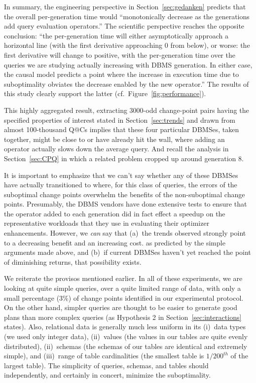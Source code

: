 \documentclass[prodmode,acmtods]{acmsmall}
\begin{document}
In summary, the engineering perspective in Section~\ref{sec:gedanken}
predicts that the overall per-generation time would ``monotonically decrease
as the generations add query evaluation operators.'' The scientific
perspective reaches the opposite conclusion: ``the
per-generation time will either asymptotically approach a horizontal line
(with the first derivative approaching 0 from below), or worse: the first
derivative will change to positive, with the per-generation time over the
queries we are studying actually increasing with \hbox{DBMS}
generation. In either case, the causal model predicts a point where the
\hbox{increase} in execution time due to suboptimality obviates the decrease
enabled by the new operator.'' The results of this study clearly support
the latter (cf.~Figure~\ref{fig:performance}).

This highly aggregated result, extracting 3000-odd change-point pairs having
the specified properties of interest stated in Section~\ref{sec:trends} and
drawn from almost \hbox{100-thousand} Q@Cs implies that these four
particular \hbox{DBMSes}, taken together, might be close to or have already
hit the wall, where adding an operator actually slows down the average
query. And recall the analysis in Section~\ref{sec:CPQ} in which a
related problem cropped up around generation 8.

It is important to emphasize that we can't say whether any of these DBMSes have actually
transitioned to where, for this class of queries, the errors of the
suboptimal change points overwhelm the benefits of the non-suboptimal change
points. Presumably, the DBMS vendors have done extensive tests to ensure
that the operator added to each generation did in fact effect a speedup on
the representative workloads that they use in evaluating their optimizer
enhancements. However, we {\em can} say that (a)~the trends observed
strongly point to a decreasing benefit and an increasing cost. as predicted
by the simple arguments made above, and (b)~if current DBMSes haven't yet
reached the point of diminishing returns, that possibility exists.

We reiterate the provisos mentioned earlier. In all of these
experiments, we are looking at quite simple queries, over a quite limited
range of data, with only a small percentage (3\%) of change points
identified in our experimental protocol. On the other hand, simpler queries
are thought to be easier to generate good plans than more complex queries
(as Hypothesis 2 in Section~\ref{sec:interactions} states). Also, relational
data is generally much less uniform in its (i)~data types (we used only
integer data), (ii)~values (the values in our tables are quite evenly
distributed), (ii)~schemas (the schemas of our tables are identical and
extremely simple), and (iii)~range of table cardinalities (the smallest
table is $1/{200}^{th}$ of the largest table). The simplicity of queries, schemas,
and tables should independently, and certainly in concert, minimize the
suboptimality.
\end{document}
